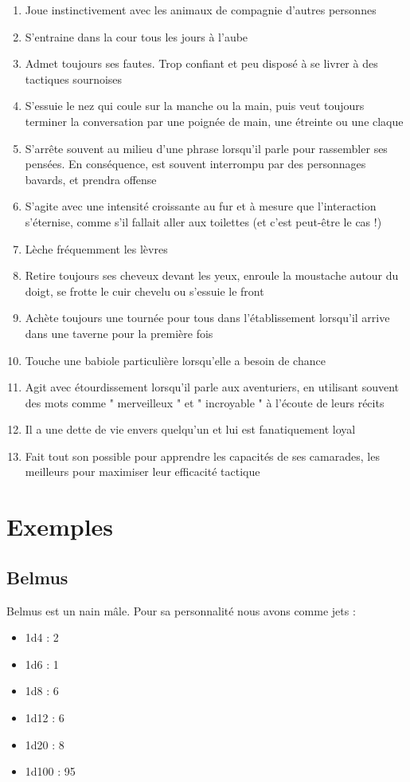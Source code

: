 \documentclass{article}
\begin{document}
\begin{multicols}{2}
\begin{enumerate}
		\item Joue instinctivement avec les animaux de compagnie d'autres personnes
		\item S’entraine dans la cour tous les jours à l'aube
		\item Admet toujours ses fautes. Trop confiant et peu disposé à se livrer à des tactiques sournoises
		\item S'essuie le nez qui coule sur la manche ou la main, puis veut toujours terminer la conversation par une poignée de main, une étreinte ou une claque
		\item S'arrête souvent au milieu d'une phrase lorsqu'il parle pour rassembler ses pensées. En conséquence, est souvent interrompu par des personnages bavards, et prendra offense
		\item S'agite avec une intensité croissante au fur et à mesure que l'interaction s'éternise, comme s'il fallait aller aux toilettes (et c'est peut-être le cas !)
		\item Lèche fréquemment les lèvres
		\item Retire toujours ses cheveux devant les yeux, enroule la moustache autour du doigt, se frotte le cuir chevelu ou s’essuie le front
		\item Achète toujours une tournée pour tous dans l'établissement lorsqu'il arrive dans une taverne pour la première fois
		\item Touche une babiole particulière lorsqu'elle a besoin de chance
		\item Agit avec étourdissement lorsqu'il parle aux aventuriers, en utilisant souvent des mots comme " merveilleux " et " incroyable " à l'écoute de leurs récits
		\item Il a une dette de vie envers quelqu'un et lui est fanatiquement loyal
		\item Fait tout son possible pour apprendre les capacités de ses camarades, les meilleurs pour maximiser leur efficacité tactique
	\end{enumerate}
\end{multicols}

\section*{Exemples}
\subsection*{Belmus}
Belmus est un nain mâle. Pour sa personnalité nous avons comme jets :
\begin{itemize}
	\item 1d4 : 2
	\item 1d6 : 1
	\item 1d8 : 6
	\item 1d12 : 6
	\item 1d20 : 8
	\item 1d100 : 95 
\end{itemize}
\end{document}
